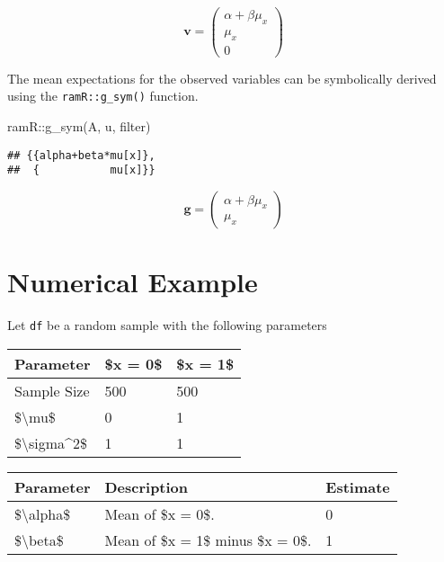 \documentclass[
]{book}
\newenvironment{Shaded}{\begin{snugshade}}{\end{snugshade}}
\newcommand{\FunctionTok}[1]{\textcolor[rgb]{0.00,0.00,0.00}{#1}}
\newcommand{\NormalTok}[1]{#1}
\newcommand{\SpecialCharTok}[1]{\textcolor[rgb]{0.00,0.00,0.00}{#1}}
\theoremstyle{definition}
\theoremstyle{definition}
\theoremstyle{definition}
\theoremstyle{remark}
\begin{document}
\begin{equation*}\mathbf{v} =\left( \begin{array}{c} \alpha  + \beta  \mu  _{x} \\ \mu  _{x} \\ 0 \end{array} \right)\end{equation*}

The mean expectations for the observed variables
can be symbolically derived using the \texttt{ramR::g\_sym()} function.

\begin{Shaded}
\begin{Highlighting}[]
\NormalTok{ramR}\SpecialCharTok{::}\FunctionTok{g\_sym}\NormalTok{(A, u, filter)}
\end{Highlighting}
\end{Shaded}

\begin{verbatim}
## {{alpha+beta*mu[x]},
##  {           mu[x]}}
\end{verbatim}

\begin{equation*}\mathbf{g} =\left( \begin{array}{c} \alpha  + \beta  \mu  _{x} \\ \mu  _{x} \end{array} \right)\end{equation*}

\hypertarget{numerical-example}{%
\section{Numerical Example}\label{numerical-example}}

Let \texttt{df} be a random sample with the following parameters

\begin{tabular}{l|l|l}
\hline
Parameter & \$x = 0\$ & \$x = 1\$\\
\hline
Sample Size & 500 & 500\\
\hline
\$\textbackslash{}mu\$ & 0 & 1\\
\hline
\$\textbackslash{}sigma\textasciicircum{}2\$ & 1 & 1\\
\hline
\end{tabular}

\begin{tabular}{l|l|l}
\hline
Parameter & Description & Estimate\\
\hline
\$\textbackslash{}alpha\$ & Mean of \$x = 0\$. & 0\\
\hline
\$\textbackslash{}beta\$ & Mean of \$x = 1\$ minus \$x = 0\$. & 1\\
\hline
\end{tabular}
\end{document}
